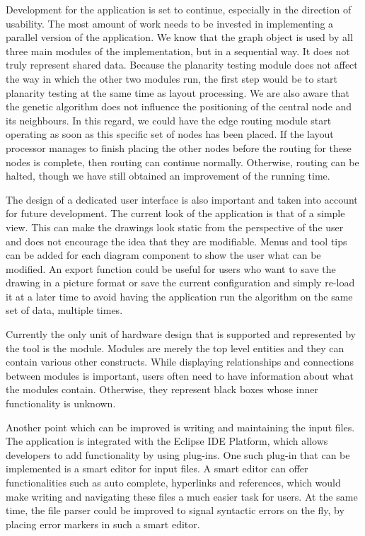 Development for the application is set to continue, especially in the direction of usability. The most amount 
of work needs to be invested in implementing a parallel version of the application. We know that the graph 
object is used by all three main modules of the implementation, but in a sequential way. It does not truly 
represent shared data. Because the planarity testing module does not affect the way in which the other two modules 
run, the first step would be to start planarity testing at the same time as layout processing. We are also aware 
that the genetic algorithm does not influence the positioning of the central node and its neighbours. In this 
regard, we could have the edge routing module start operating as soon as this specific set of nodes has been 
placed. If the layout processor manages to finish placing the other nodes before the routing for these nodes 
is complete, then routing can continue normally. Otherwise, routing can be halted, though we have still obtained 
an improvement of the running time.

The design of a dedicated user interface is also important and taken into account for future development. 
The current look of the application is that of a simple view. This can make the drawings look static from 
the perspective of the user and does not encourage the idea that they are modifiable. Menus and tool tips 
can be added for each diagram component to show the user what can be modified. An export function could 
be useful for users who want to save the drawing in a picture format or save the current configuration and 
simply re-load it at a later time to avoid having the application run the algorithm on the same set of 
data, multiple times.

Currently the only unit of hardware design that is supported and represented by the tool is the module. Modules 
are merely the top level entities and they can contain various other constructs. While displaying relationships 
and connections between modules is important, users often need to have information about what the modules contain. 
Otherwise, they represent black boxes whose inner functionality is unknown.

Another point which can be improved is writing and maintaining the input files. The application is integrated 
with the Eclipse IDE Platform, which allows developers to add functionality by using plug-ins. One such plug-in 
that can be implemented is a smart editor for input files. A smart editor can offer functionalities such as 
auto complete, hyperlinks and references, which would make writing and navigating these files a much easier 
task for users. At the same time, the file parser could be improved to signal syntactic errors on the fly, 
by placing error markers in such a smart editor.
